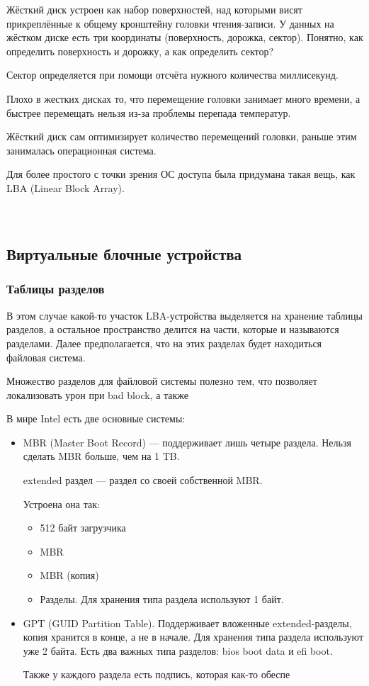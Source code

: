 Жёсткий диск устроен как набор поверхностей, над которыми висят прикреплённые к общему кронштейну головки чтения-записи. У данных на жёстком диске есть три координаты (поверхность, дорожка, сектор). Понятно, как определить поверхность и дорожку, а как определить сектор?

Сектор определяется при помощи отсчёта нужного количества миллисекунд.

Плохо в жестких дисках то, что перемещение головки занимает много времени, а быстрее перемещать нельзя из-за проблемы перепада температур. 

Жёсткий диск сам оптимизирует количество перемещений головки, раньше этим занималась операционная система.

Для более простого с точки зрения ОС доступа была придумана такая вещь, как LBA (Linear Block Array). \\
\\
\\
\subsection*{Виртуальные блочные устройства}

\subsubsection{Таблицы разделов} 

В этом случае какой-то участок LBA-устройства выделяется на хранение таблицы разделов, а остальное пространство делится на части, которые и называются разделами. Далее предполагается, что на этих разделах будет находиться файловая система.

Множество разделов для файловой системы полезно тем, что позволяет локализовать урон при bad block, а также 

В мире Intel есть две основные системы:
\begin{itemize}
\item MBR (Master Boot Record) --- поддерживает лишь четыре раздела. Нельзя сделать MBR больше, чем на 1 TB.

extended раздел --- раздел со своей собственной MBR.

Устроена она так:

\begin{itemize}
\item 512 байт загрузчика
\item MBR
\item MBR (копия)
\item Разделы. Для хранения типа раздела используют 1 байт.
\end{itemize}
\item GPT (GUID Partition Table). Поддерживает вложенные extended-разделы, копия хранится в конце, а не в начале. Для хранения типа раздела используют уже 2 байта. Есть два важных типа разделов: bios boot data и efi boot.

Также у каждого раздела есть подпись, которая как-то обеспе
\end{itemize}

